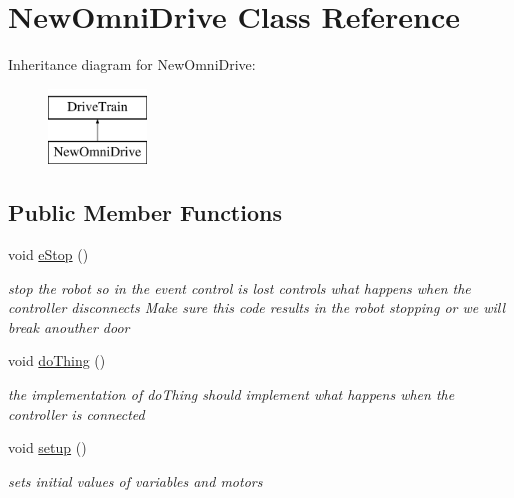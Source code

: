 \hypertarget{class_new_omni_drive}{}\section{New\+Omni\+Drive Class Reference}
\label{class_new_omni_drive}
Inheritance diagram for New\+Omni\+Drive\+:\begin{figure}[H]
\begin{center}
\leavevmode
\includegraphics[height=2.000000cm]{class_new_omni_drive}
\end{center}
\end{figure}
\subsection*{Public Member Functions}
\begin{DoxyCompactItemize}
\item 
\mbox{\label{class_new_omni_drive_a797de6052c568bd7f664735990d3c9e3}} 
void \mbox{\hyperlink{class_new_omni_drive_a797de6052c568bd7f664735990d3c9e3}{e\+Stop}} ()
\begin{DoxyCompactList}\small\item\em stop the robot so in the event control is lost controls what happens when the controller disconnects Make sure this code results in the robot stopping or we will break anouther door \end{DoxyCompactList}\item 
\mbox{\label{class_new_omni_drive_a22f05bdd45839ef398b3933d34b70f1e}} 
void \mbox{\hyperlink{class_new_omni_drive_a22f05bdd45839ef398b3933d34b70f1e}{do\+Thing}} ()
\begin{DoxyCompactList}\small\item\em the implementation of do\+Thing should implement what happens when the controller is connected \end{DoxyCompactList}\item 
\mbox{\label{class_new_omni_drive_a6a3e663747507f94db0ad91428a64732}} 
void \mbox{\hyperlink{class_new_omni_drive_a6a3e663747507f94db0ad91428a64732}{setup}} ()
\begin{DoxyCompactList}\small\item\em sets initial values of variables and motors \end{DoxyCompactList}\end{DoxyCompactItemize}
